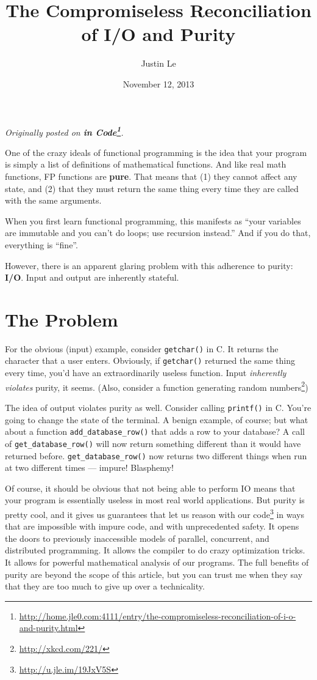 \documentclass[]{article}
\title{The Compromiseless Reconciliation of I/O and Purity}
\author{Justin Le}
\date{November 12, 2013}
\renewcommand{\href}[2]{#2\footnote{\url{#1}}}
\begin{document}
\maketitle

\emph{Originally posted on
\textbf{\href{http://home.jle0.com:4111/entry/the-compromiseless-reconciliation-of-i-o-and-purity.html}{in
Code}}.}

One of the crazy ideals of functional programming is the idea that your
program is simply a list of definitions of mathematical functions. And
like real math functions, FP functions are \textbf{pure}. That means
that (1) they cannot affect any state, and (2) that they must return the
same thing every time they are called with the same arguments.

When you first learn functional programming, this manifests as ``your
variables are immutable and you can't do loops; use recursion instead.''
And if you do that, everything is ``fine''.

However, there is an apparent glaring problem with this adherence to
purity: \textbf{I/O}. Input and output are inherently stateful.

\section{The Problem}\label{the-problem}

For the obvious (input) example, consider \texttt{getchar()} in C. It
returns the character that a user enters. Obviously, if
\texttt{getchar()} returned the same thing every time, you'd have an
extraordinarily useless function. Input \emph{inherently violates}
purity, it seems. (Also, consider a \href{http://xkcd.com/221/}{function
generating random numbers})

The idea of output violates purity as well. Consider calling
\texttt{printf()} in C. You're going to change the state of the
terminal. A benign example, of course; but what about a function
\texttt{add\_database\_row()} that adds a row to your database? A call
of \texttt{get\_database\_row()} will now return something different
than it would have returned before. \texttt{get\_database\_row()} now
returns two different things when run at two different times --- impure!
Blasphemy!

Of course, it should be obvious that not being able to perform IO means
that your program is essentially useless in most real world
applications. But purity is pretty cool, and it gives us guarantees that
let us \href{http://u.jle.im/19JxV5S}{reason with our code} in ways that
are impossible with impure code, and with unprecedented safety. It opens
the doors to previously inaccessible models of parallel, concurrent, and
distributed programming. It allows the compiler to do crazy optimization
tricks. It allows for powerful mathematical analysis of our programs.
The full benefits of purity are beyond the scope of this article, but
you can trust me when they say that they are too much to give up over a
technicality.
\end{document}

